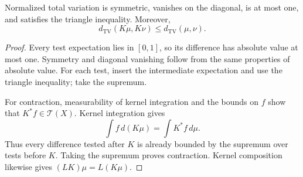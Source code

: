 \begin{theorem}
\label{thm:variation-contraction}
Normalized total variation is symmetric, vanishes on the diagonal,
is at most one, and satisfies the triangle inequality. Moreover,
\[
 d_{\mathrm{TV}}(K\mu,K\nu)\le d_{\mathrm{TV}}(\mu,\nu).
\]
\end{theorem}
\begin{proof}
Every test expectation lies in $[0,1]$, so its difference has absolute
value at most one. Symmetry and diagonal vanishing follow from the same
properties of absolute value. For each test, insert the intermediate
expectation and use the triangle inequality; take the supremum.

For contraction, measurability of kernel integration and the bounds on
$f$ show that $K^*f\in\mathcal T(X)$. Kernel integration gives
\[
 \int f\,d(K\mu)=\int K^*f\,d\mu.
\]
Thus every difference tested after $K$ is already bounded by the
supremum over tests before $K$. Taking the supremum proves contraction.
Kernel composition likewise gives $(LK)\mu=L(K\mu)$.
\end{proof}



